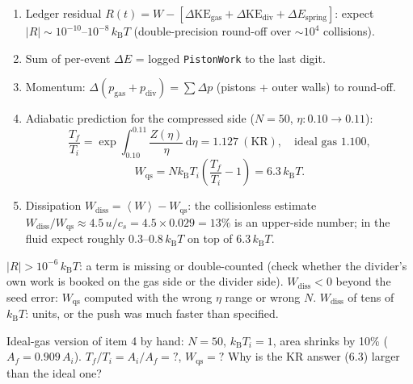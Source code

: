\documentclass[11pt,a4paper]{article}
\newcommand{\kT}{k_{\mathrm B}T}
\newcommand{\avg}[1]{\left\langle #1 \right\rangle}
\newcommand{\dd}{\mathrm{d}}
\begin{document}
\begin{num}
\begin{enumerate}[nosep]
\item Ledger residual $R(t) = W - [\Delta\mathrm{KE}_{\mathrm{gas}} + \Delta\mathrm{KE}_{\mathrm{div}} + \Delta E_{\mathrm{spring}}]$: expect $|R| \sim 10^{-10}$--$10^{-8}\,\kT$ (double-precision round-off over $\sim10^4$ collisions).
\item Sum of per-event $\Delta E$ = logged \texttt{PistonWork} to the last digit.
\item Momentum: $\Delta(p_{\mathrm{gas}} + p_{\mathrm{div}}) = \sum\Delta p$ (pistons + outer walls) to round-off.
\item Adiabatic prediction for the compressed side ($N = 50$, $\eta: 0.10\to0.11$):
\begin{equation}
\frac{T_f}{T_i} = \exp\!\int_{0.10}^{0.11}\frac{Z(\eta)}{\eta}\,\dd\eta = 1.127\ (\text{KR}),\quad\text{ideal gas } 1.100,
\end{equation}
\begin{equation}
W_{\mathrm{qs}} = N\kT_i\left(\frac{T_f}{T_i}-1\right) = 6.3\,\kT .
\end{equation}
\item Dissipation $W_{\mathrm{diss}} = \avg W - W_{\mathrm{qs}}$: the collisionless estimate $W_{\mathrm{diss}}/W_{\mathrm{qs}} \approx 4.5\,u/c_s = 4.5\times0.029 = 13\%$ is an upper-side number; in the fluid expect roughly $0.3$--$0.8\,\kT$ on top of $6.3\,\kT$.
\end{enumerate}
\end{num}
\begin{wrong}
$|R| > 10^{-6}\,\kT$: a term is missing or double-counted (check whether the divider's own work is booked on the gas side or the divider side). $W_{\mathrm{diss}} < 0$ beyond the seed error: $W_{\mathrm{qs}}$ computed with the wrong $\eta$ range or wrong $N$. $W_{\mathrm{diss}}$ of tens of $\kT$: units, or the push was much faster than specified.
\end{wrong}

\begin{ex}[Exercise 5]
Ideal-gas version of item 4 by hand: $N = 50$, $\kT_i = 1$, area shrinks by 10\% ($A_f = 0.909\,A_i$). $T_f/T_i = A_i/A_f = ?$, $W_{\mathrm{qs}} = ?$ Why is the KR answer ($6.3$) larger than the ideal one?
\end{ex}
\end{document}
